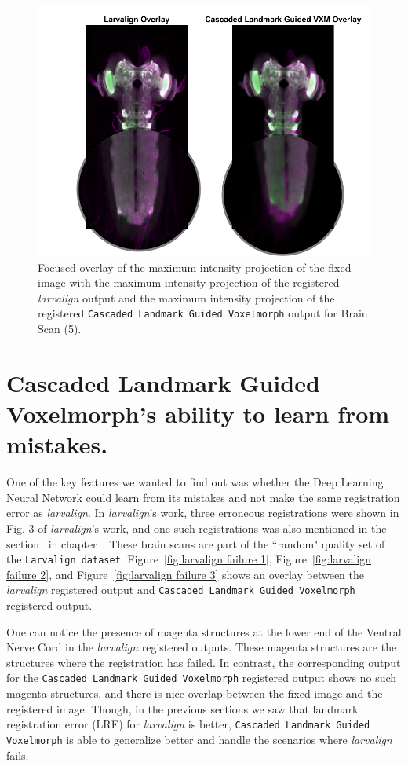 \documentclass{book}
\begin{document}
	\begin{figure}[h!]
		\centering
		\includegraphics[width=0.7\columnwidth]{resources/chapter7/LRE_Visual/14c08c_overlay_zoomed.png}
		\caption{Focused overlay of the maximum intensity projection of the fixed image with the maximum intensity projection of the registered \textit{larvalign} output and the maximum intensity projection of the registered \texttt{Cascaded Landmark Guided Voxelmorph} output for Brain Scan (5).}
		\label{fig:14c08c_overlay}
	\end{figure}
	
	\newpage
	\section{Cascaded Landmark Guided Voxelmorph's ability to learn from mistakes.}
	One of the key features we wanted to find out was whether the Deep Learning Neural Network could learn from its mistakes and not make the same registration error as \textit{larvalign}. In \emph{larvalign}'s work, three erroneous registrations were shown in Fig. 3 of \textit{larvalign}'s work, and one such registrations was also mentioned in the section~ in chapter~. These brain scans are part of the ``random" quality set of the \texttt{Larvalign dataset}. Figure~\ref{fig:larvalign failure 1}, Figure~\ref{fig:larvalign failure 2}, and Figure~\ref{fig:larvalign failure 3} shows an overlay between the \textit{larvalign} registered output and \texttt{Cascaded Landmark Guided Voxelmorph} registered output.
	
	One can notice the presence of magenta structures at the lower end of the Ventral Nerve Cord in the \textit{larvalign} registered outputs. These magenta structures are the structures where the registration has failed. In contrast, the corresponding output for the \texttt{Cascaded Landmark Guided Voxelmorph} registered output shows no such magenta structures, and there is nice overlap between the fixed image and the registered image. Though, in the previous sections we saw that landmark registration error (LRE) for \textit{larvalign} is better, \texttt{Cascaded Landmark Guided Voxelmorph} is able to generalize better and handle the scenarios where \textit{larvalign} fails.
	
\end{document}
